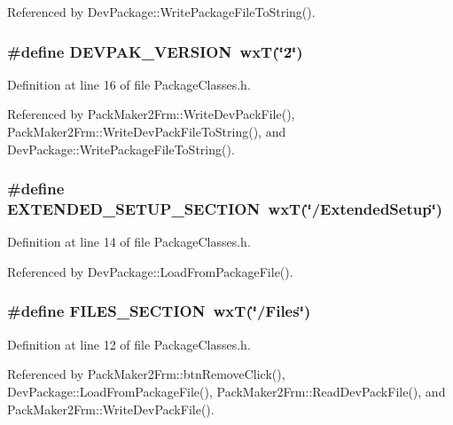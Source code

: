 Referenced by Dev\-Package::Write\-Package\-File\-To\-String().
\subsubsection{\setlength{\rightskip}{0pt plus 5cm}\#define DEVPAK\_\-VERSION~wx\-T(\char`\"{}2\char`\"{})}\label{_package_classes_8h_92a6548b6213c7257d57c1f8dbb8d0cd}




Definition at line 16 of file Package\-Classes.h.

Referenced by Pack\-Maker2Frm::Write\-Dev\-Pack\-File(), Pack\-Maker2Frm::Write\-Dev\-Pack\-File\-To\-String(), and Dev\-Package::Write\-Package\-File\-To\-String().
\subsubsection{\setlength{\rightskip}{0pt plus 5cm}\#define EXTENDED\_\-SETUP\_\-SECTION~wx\-T(\char`\"{}/Extended\-Setup\char`\"{})}\label{_package_classes_8h_2aa827fcdad592a14081c1d43e9e03f4}




Definition at line 14 of file Package\-Classes.h.

Referenced by Dev\-Package::Load\-From\-Package\-File().
\subsubsection{\setlength{\rightskip}{0pt plus 5cm}\#define FILES\_\-SECTION~wx\-T(\char`\"{}/Files\char`\"{})}\label{_package_classes_8h_2e3ed298edb5819c219be62d17ee7b60}




Definition at line 12 of file Package\-Classes.h.

Referenced by Pack\-Maker2Frm::btn\-Remove\-Click(), Dev\-Package::Load\-From\-Package\-File(), Pack\-Maker2Frm::Read\-Dev\-Pack\-File(), and Pack\-Maker2Frm::Write\-Dev\-Pack\-File().
